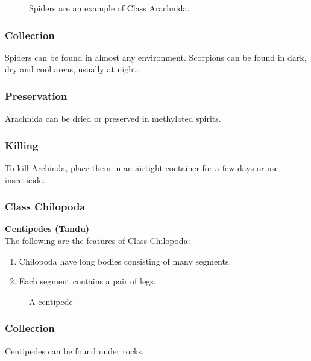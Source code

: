 \begin{figure}[h]
\begin{center}
\def\svgwidth{6cm}

\caption{Spiders are an example of Class Arachnida.}
\label{fig:fish}
\end{center}
\end{figure}

\subsubsection{Collection}
Spiders can be found in almost any environment. Scorpions can be found in dark, dry and cool areas, usually at night.

\subsubsection{Preservation} 
Arachnida can be dried or preserved in methylated spirits.

\subsubsection{Killing}
To kill Archinda, place them in an airtight container for a few days or use insecticide.
		
\subsubsection{Class Chilopoda}
\textbf{Centipedes (Tandu)}\\
The following are the features of Class Chilopoda:
\begin{enumerate}
\item{Chilopoda have long bodies consisting of many segments.}
\item{Each segment contains a pair of legs.}
\end{enumerate}

\begin{figure}[h]
\begin{center}
\def\svgwidth{8cm}

\caption{A centipede}
\label{fig:centipede}
\end{center}
\end{figure}

\subsubsection{Collection}
Centipedes can be found under rocks.

